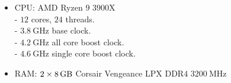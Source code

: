 \documentclass[reprint,english,notitlepage]{revtex4-1}  %
\begin{document}
\begin{itemize}
	\item CPU: AMD Ryzen \(9\) \(3900\)X \\
		- \(12\) cores, \(24\) threads. \\ 
		- \(\SI{3.8}{\giga\hertz}\) base clock. \\
		- \(\SI{4.2}{\giga\hertz}\) all core boost clock. \\
		- \(\SI{4.6}{\giga\hertz}\) single core boost clock. \\
	\item RAM: \(2\times\SI{8}{\giga\byte}\) Corsair Vengeance LPX DDR\(4\) \(\SI{3200}{\mega\hertz}\)
\end{itemize}
\end{document}
